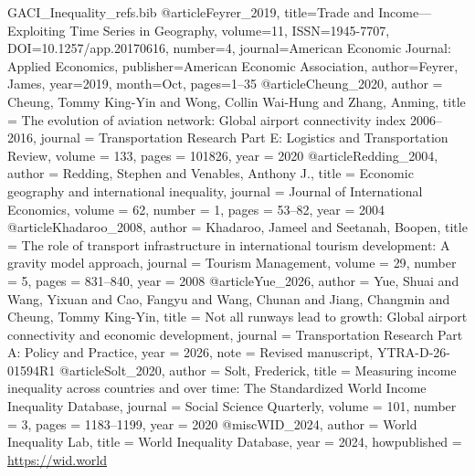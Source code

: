 \begin{filecontents*}[overwrite]{GACI_Inequality_refs.bib}
@article{Feyrer_2019, title={Trade and Income---Exploiting Time Series in Geography}, volume={11}, ISSN={1945-7707}, DOI={10.1257/app.20170616}, number={4}, journal={American Economic Journal: Applied Economics}, publisher={American Economic Association}, author={Feyrer, James}, year={2019}, month=Oct, pages={1--35} }
@article{Cheung_2020,
  author = {Cheung, Tommy King-Yin and Wong, Collin Wai-Hung and Zhang, Anming},
  title = {The evolution of aviation network: Global airport connectivity index 2006--2016},
  journal = {Transportation Research Part E: Logistics and Transportation Review},
  volume = {133}, pages = {101826}, year = {2020}
}
@article{Redding_2004,
  author = {Redding, Stephen and Venables, Anthony J.},
  title = {Economic geography and international inequality},
  journal = {Journal of International Economics},
  volume = {62}, number = {1}, pages = {53--82}, year = {2004}
}
@article{Khadaroo_2008,
  author = {Khadaroo, Jameel and Seetanah, Boopen},
  title = {The role of transport infrastructure in international tourism development: A gravity model approach},
  journal = {Tourism Management},
  volume = {29}, number = {5}, pages = {831--840}, year = {2008}
}
@article{Yue_2026,
  author = {Yue, Shuai and Wang, Yixuan and Cao, Fangyu and Wang, Chunan and Jiang, Changmin and Cheung, Tommy King-Yin},
  title = {Not all runways lead to growth: Global airport connectivity and economic development},
  journal = {Transportation Research Part A: Policy and Practice},
  year = {2026},
  note = {Revised manuscript, YTRA-D-26-01594R1}
}
@article{Solt_2020,
  author = {Solt, Frederick},
  title = {Measuring income inequality across countries and over time: The Standardized World Income Inequality Database},
  journal = {Social Science Quarterly},
  volume = {101}, number = {3}, pages = {1183--1199}, year = {2020}
}
@misc{WID_2024,
  author = {{World Inequality Lab}},
  title = {World Inequality Database},
  year = {2024},
  howpublished = {\url{https://wid.world}}
}
\end{filecontents*}

\documentclass[review,3p,times,authoryear]{elsarticle}

\usepackage{lineno,hyperref}
\usepackage{amsmath,amssymb}
\usepackage{graphicx}
\usepackage{booktabs}
\usepackage{threeparttable}
\usepackage{multirow}
\usepackage{url}
\usepackage{float}

\providecommand{\DOIprefix}{}\renewcommand{\DOIprefix}{}
\providecommand{\URLprefix}{}\renewcommand{\URLprefix}{}
\providecommand{\doi}[1]{}\renewcommand{\doi}[1]{\href{https://doi.org/#1}{\nolinkurl{https://doi.org/#1}}}

